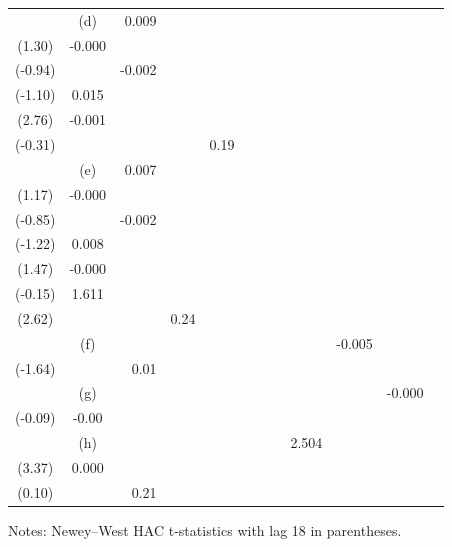 \begin{table}[p]
\begin{tabular}{ccrrrrrrrrrr}
 & (d) & 0.009\\ (1.30) & -0.000\\ (-0.94) &  & -0.002\\ (-1.10) & 0.015\\ (2.76) & -0.001\\ (-0.31) &  &  &  & 0.19\\
 & (e) & 0.007\\ (1.17) & -0.000\\ (-0.85) &  & -0.002\\ (-1.22) & 0.008\\ (1.47) & -0.000\\ (-0.15) & 1.611\\ (2.62) &  &  & 0.24\\
 & (f) &  &  &  &  &  &  &  & -0.005\\ (-1.64) &  & 0.01\\
 & (g) &  &  &  &  &  &  &  &  & -0.000\\ (-0.09) & -0.00\\
 & (h) &  &  &  &  &  &  & 2.504\\ (3.37) & 0.000\\ (0.10) &  & 0.21\\
\hline
\end{tabular}
\vspace{2mm}\par\footnotesize Notes: Newey--West HAC t-statistics with lag 18 in parentheses.
\end{table}
